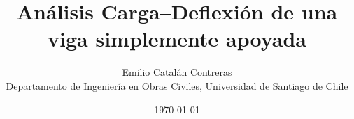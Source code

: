 \documentclass[10pt,letterpaper]{article}
\title{Análisis Carga--Deflexión de una viga simplemente apoyada}
\author{Emilio Catalán Contreras\\
       {\footnotesize Departamento de Ingeniería en Obras Civiles, Universidad de Santiago de Chile}
}
\date{\today}
\begin{document}
\maketitle



\renewcommand*{\bibfont}{\footnotesize}
\printbibliography%
\end{document}
